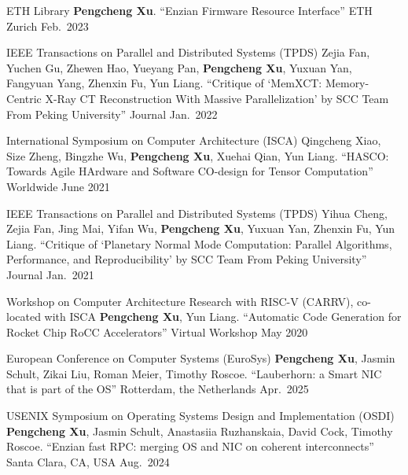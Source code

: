 \begin{cventries}
  \cventry
    {ETH Library}
    {{\normalfont \textbf{Pengcheng Xu}. ``Enzian Firmware Resource Interface''}}
    {ETH Zurich} %
    {Feb.\ 2023} %
    {}

  \cventry
    {IEEE Transactions on Parallel and Distributed Systems (TPDS)}
    {{\normalfont Zejia Fan, Yuchen Gu, Zhewen Hao, Yueyang Pan, \textbf{Pengcheng Xu}, Yuxuan Yan, Fangyuan Yang, Zhenxin Fu, Yun Liang. ``Critique of `MemXCT: Memory-Centric X-Ray CT Reconstruction With Massive Parallelization' by SCC Team From Peking University''}}
    {Journal} %
    {Jan.\ 2022} %
    {}

  \cventry
    {International Symposium on Computer Architecture (ISCA)}
    {{\normalfont Qingcheng Xiao, Size Zheng, Bingzhe Wu, \textbf{Pengcheng Xu}, Xuehai Qian, Yun Liang. ``HASCO: Towards Agile HArdware and Software CO-design for Tensor Computation''}}
    {Worldwide} %
    {June 2021} %
    {}

  \cventry
    {IEEE Transactions on Parallel and Distributed Systems (TPDS)}
    {{\normalfont Yihua Cheng, Zejia Fan, Jing Mai, Yifan Wu, \textbf{Pengcheng Xu}, Yuxuan Yan, Zhenxin Fu, Yun Liang. ``Critique of `Planetary Normal Mode Computation: Parallel Algorithms, Performance, and Reproducibility' by SCC Team From Peking University''}}
    {Journal} %
    {Jan.\ 2021} %
    {}

  \cventry
    {Workshop on Computer Architecture Research with RISC-V (CARRV), co-located with ISCA} %
    {{\normalfont \textbf{Pengcheng Xu}, Yun Liang. ``Automatic Code Generation for Rocket Chip RoCC Accelerators''}} %
    {Virtual Workshop} %
    {May 2020} %
    {}
\end{cventries}

\begin{cventries}

  \cventry
    {European Conference on Computer Systems (EuroSys)}
    {{\normalfont \textbf{Pengcheng Xu}, Jasmin Schult, Zikai Liu, Roman Meier, Timothy Roscoe. ``Lauberhorn: a Smart NIC that is part of the OS''}}
    {Rotterdam, the Netherlands} %
    {Apr.\ 2025} %
    {}

  \cventry
    {USENIX Symposium on Operating Systems Design and Implementation (OSDI)}
    {{\normalfont \textbf{Pengcheng Xu}, Jasmin Schult, Anastasiia Ruzhanskaia, David Cock, Timothy Roscoe. ``Enzian fast RPC: merging OS and NIC on coherent interconnects''}}
    {Santa Clara, CA, USA} %
    {Aug.\ 2024} %
    {}

\end{cventries}
